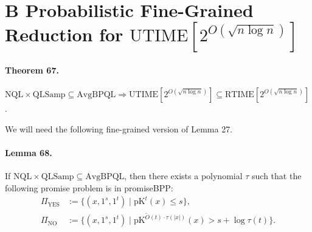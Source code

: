 \documentclass[10pt,a4paper]{article}
\begin{document}
\section*{B Probabilistic Fine-Grained Reduction for $\mathrm{UTIME}[2^{O(\sqrt{n\log n})}]$}

\paragraph{Theorem 67.} $\mathrm{NQL}\times\mathrm{QLSamp}\subseteq\mathrm{AvgBPQL}\Longrightarrow\mathrm{UTIME}[2^{O(\sqrt{n\log n})}]\subseteq\mathrm{RTIME}[2^{O(\sqrt{n\log n})}]$.

We will need the following fine-grained version of Lemma 27.
\paragraph{Lemma 68.} If $\mathrm{NQL}\times\mathrm{QLSamp}\subseteq\mathrm{AvgBPQL}$, then there exists a polynomial $\tau$ such that the following promise problem is in promiseBPP:
\begin{align*}
\Pi_{\mathrm{YES}}&:=\{(x,1^s,1^t)\mid\mathrm{pK}^t(x)\leq s\},\\
\Pi_{\mathrm{NO}}&:=\{(x,1^s,1^t)\mid\mathrm{pK}^{\widetilde O(t)\cdot\tau(|x|)}(x)>s+\log\tau(t)\}.
\end{align*}
\end{document}
